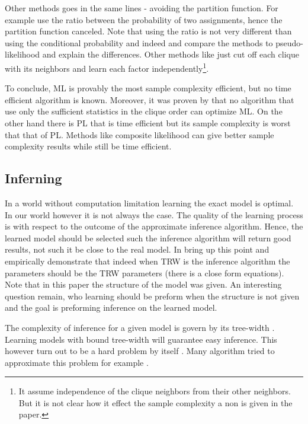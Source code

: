 Other methods goes in the same lines - avoiding the partition function. 
For example \cite{hyvarinen2007some} use the ratio between the probability of two assignments, hence the partition function canceled.
Note that using the ratio is not very different than using the conditional probability and indeed \cite{marlin2010inductive} and \cite{marlin2012asymptotic} compare the methods to pseudo-likelihood and explain the differences.
Other methods like \cite{mizrahi2014icml} just cut off each clique with its neighbors and learn each factor independently\footnote{It assume independence of the clique neighbors from their other neighbors. But it is not clear how it effect the sample complexity a non is given in the paper. }.

To conclude, ML is provably the most sample complexity efficient,   but no time efficient algorithm is known.
Moreover, it was proven by \cite{bresler2014hardness,montanari2015computational} that no algorithm that use only the sufficient statistics in the clique order can optimize ML.
On the other hand there is PL that is time efficient but its sample complexity is worst that that of PL.
Methods like composite likelihood can give better sample complexity results while still be time efficient.

\subsection{Inferning}
In a world without computation limitation learning the exact model is optimal.
In our world however it is not always the case.
The quality of the learning process is with respect to the outcome of the approximate inference  algorithm.
Hence, the learned model should be selected such the inference algorithm will return good results, not such it be close to the real model.
In \cite{wainwright2006estimating} bring up this point and empirically demonstrate that indeed when TRW is the inference algorithm the parameters should be the TRW parameters (there is a close form equations). 
Note that in this paper the structure of the model was given.
An interesting question remain, who learning should be preform when the structure is not given and the goal is preforming inference on the learned model.

The complexity of inference for a given model is govern by its tree-width \cite{robertson1983graph,robertson1994quickly}.
Learning models with bound tree-width will guarantee easy inference.
This however turn out to be a hard problem by itself \cite{srebro2001maximum}.
Many algorithm tried to approximate this problem for example \cite{karger2001learning,bach2001thin,elidan2009learning}.

